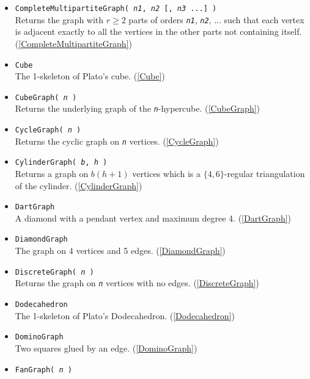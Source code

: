 \documentclass[a4paper,11pt]{report}
\begin{document}
{{\begin{itemize}
 Returns the graph on \mbox{\texttt{\mdseries\slshape n}} vertices having all possible edges present. (\ref{CompleteGraph}) 
\item \texttt{CompleteMultipartiteGraph( \mbox{\texttt{\mdseries\slshape n1}}, \mbox{\texttt{\mdseries\slshape n2}} [, \mbox{\texttt{\mdseries\slshape n3}} ...] )}\\
 Returns the graph with $r\geq 2$ parts of orders \mbox{\texttt{\mdseries\slshape n1}}, \mbox{\texttt{\mdseries\slshape n2}}, ... such that each vertex is adjacent exactly to all the vertices in the
other parts not containing itself. (\ref{CompleteMultipartiteGraph}) 
\item \texttt{Cube}\\
 The 1-skeleton of Plato's cube. (\ref{Cube}) 
\item \texttt{CubeGraph( \mbox{\texttt{\mdseries\slshape n}} )}\\
 Returns the underlying graph of the \mbox{\texttt{\mdseries\slshape n}}-hypercube. (\ref{CubeGraph}) 
\item \texttt{CycleGraph( \mbox{\texttt{\mdseries\slshape n}} )}\\
 Returns the cyclic graph on \mbox{\texttt{\mdseries\slshape n}} vertices. (\ref{CycleGraph}) 
\item \texttt{CylinderGraph( \mbox{\texttt{\mdseries\slshape b}}, \mbox{\texttt{\mdseries\slshape h}} )}\\
 Returns a graph on $b(h+1)$ vertices which is a $\{4,6\}$-regular triangulation of the cylinder. (\ref{CylinderGraph}) 
\item \texttt{DartGraph}\\
 A diamond with a pendant vertex and maximum degree 4. (\ref{DartGraph}) 
\item \texttt{DiamondGraph}\\
 The graph on 4 vertices and 5 edges. (\ref{DiamondGraph}) 
\item \texttt{DiscreteGraph( \mbox{\texttt{\mdseries\slshape n}} )}\\
 Returns the graph on \mbox{\texttt{\mdseries\slshape n}} vertices with no edges. (\ref{DiscreteGraph}) 
\item \texttt{Dodecahedron}\\
 The 1-skeleton of Plato's Dodecahedron. (\ref{Dodecahedron}) 
\item \texttt{DominoGraph}\\
 Two squares glued by an edge. (\ref{DominoGraph}) 
\item \texttt{FanGraph( \mbox{\texttt{\mdseries\slshape n}} )}\\

\end{itemize}}}
\end{document}
